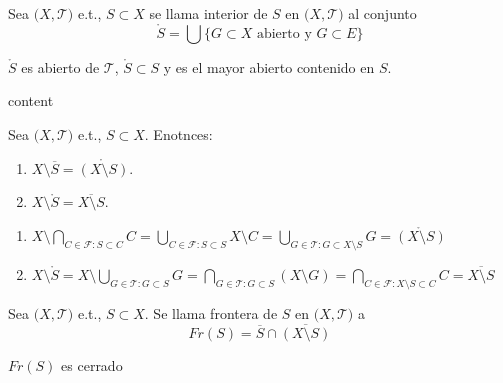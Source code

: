 \begin{defn}[Interior]
  Sea $\big( X, \mathcal{T} \big)$ e.t., $S \subset X$ se llama interior de $ S$ en $\big( X, \mathcal{T} \big)$ al conjunto \[  \mathring{S} = \bigcup \{ G \subset X \text{ abierto y } G \subset E \} \] 
\end{defn}

\begin{obs}
  $\mathring{S}$ es abierto de $\mathcal{T}$, $\mathring{S} \subset S$ y es el mayor abierto contenido en $S$.
\end{obs}

\begin{prop}
  content
\end{prop}

\begin{prop}
  Sea $\big( X, \mathcal{T} \big)$ e.t., $ S \subset X$. Enotnces:
  \begin{enumerate}[label=(\roman*)]
    \item $X \setminus \overline{S} = \mathring{(X \setminus S)}$.
    \item $X \setminus \mathring{S} = \overline{X \setminus S}$.
  \end{enumerate}
\end{prop}

\begin{dem}
  \begin{enumerate}[label=(\roman*)]
    \item $X \setminus \bigcap_{C \in \mathcal{F}: S \subset C} C = \bigcup_{C \in \mathcal{F}: S \subset S} X \setminus C = \bigcup_{G \in \mathcal{T}: G \subset X \setminus S} G = \mathring{(X \setminus S)}$
    \item $X \setminus \mathring{S} = X \setminus \bigcup_{G \in \mathcal{T}: G \subset S} G = \bigcap_{G \in \mathcal{T}: G \subset S} (X \setminus G) = \bigcap_{C \in \mathcal{F}: X \setminus S \subset C} C = \overline{X \setminus S}$
  \end{enumerate}
\end{dem}

\begin{defn}[Frontera]
  Sea $\big( X, \mathcal{T} \big)$ e.t., $ S \subset X$. Se llama frontera de $ S$ en $ \big( X, \mathcal{T} \big)$ a \[ Fr(S) = \overline{S} \cap \overline{(X \setminus S)}\]
\end{defn}

\begin{obs}
  $Fr(S)$ es cerrado
\end{obs}

